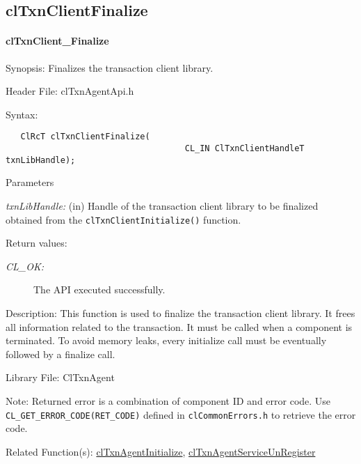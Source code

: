\begin{flushleft}
\subsection{clTxnClientFinalize}
\hypertarget{pagetxn202}{}\paragraph{cl\-Txn\-Client\_Finalize}\label{pagetxn202}
\begin{Desc}
\item[Synopsis:]Finalizes the transaction client library.\end{Desc}
\begin{Desc}
\item[Header File:]clTxnAgentApi.h\end{Desc}
\begin{Desc}
\item[Syntax:]
\footnotesize\begin{verbatim}   ClRcT clTxnClientFinalize(
                                	CL_IN ClTxnClientHandleT txnLibHandle);
\end{verbatim}
\normalsize
\end{Desc}
\begin{Desc}
\item[Parameters]
\item[{\em txn\-Lib\-Handle:}](in) Handle of the transaction client library to
    be finalized obtained from the {\tt{clTxnClientInitialize()}} function.
\end{Desc}
\begin{Desc}
\item[Return values:]
\begin{description}
\item[{\em CL\_\-OK:}]The API executed successfully.\end{description}
\end{Desc}
\begin{Desc}
\item[Description:] This function is used to finalize the transaction client library. It frees all
  information related to the transaction. It must be called when a component is terminated. To avoid memory leaks, every initialize
  call must be eventually followed by a finalize call.
\end{Desc}
\begin{Desc}
\item[Library File:]Cl\-Txn\-Agent\end{Desc}
\begin{Desc}
\item[Note:]
Returned error is a combination of component ID and error code.
 Use {\tt{CL\_\-GET\_\-ERROR\_\-CODE(RET\_\-CODE)}} defined in {\tt{clCommonErrors.h}} to
 retrieve the error code.
\end{Desc}
\begin{Desc}
\item[Related Function(s):] \hyperlink{pagetxn201}{cl\-Txn\-Agent\-Initialize}, 
\hyperlink{pagetxn204}{cl\-Txn\-Agent\-Service\-Un\-Register} \end{Desc}
\newpage







\end{flushleft}
